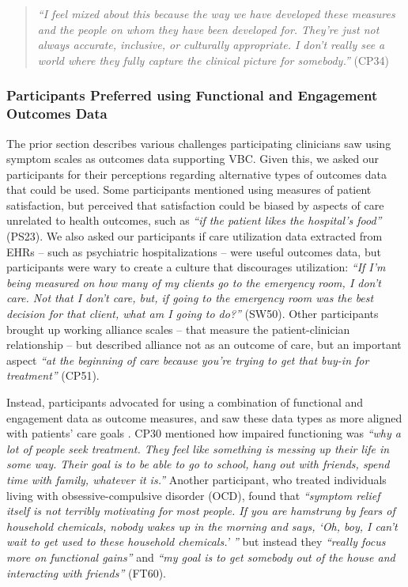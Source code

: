 \begin{quote}
    \textit{``I feel mixed about this because the way we have developed these measures and the people on whom they have been developed for. They're just not always accurate, inclusive, or culturally appropriate. 
    I don't really see a world where they fully capture the clinical picture for somebody.''} (CP34)
\end{quote}


\subsubsection{Participants Preferred using Functional and Engagement Outcomes Data}
\label{sec:findings:preparation:func-engagement}

The prior section describes various challenges participating clinicians saw using symptom scales as outcomes data supporting VBC.
Given this, we asked our participants for their perceptions regarding alternative types of outcomes data that could be used.
Some participants mentioned using measures of patient satisfaction, but perceived that satisfaction could be biased by aspects of care unrelated to health outcomes, such as \textit{``if the patient likes the hospital's food''} (PS23).
We also asked our participants if care utilization data extracted from EHRs -- such as psychiatric hospitalizations -- were useful outcomes data, but participants were wary to create a culture that discourages utilization: \textit{``If I'm being measured on how many of my clients go to the emergency room, I don't care. Not that I don't care, but, if going to the emergency room was the best decision for that client, what am I going to do?''} (SW50).
Other participants brought up working alliance scales -- that measure the patient-clinician relationship -- but described alliance not as an outcome of care, but an important aspect \textit{``at the beginning of care because you're trying to get that buy-in for treatment''} (CP51).

Instead, participants advocated for using a combination of functional and engagement data as outcome measures, and saw these data types as more aligned with patients' care goals . 
CP30 mentioned how impaired functioning was \textit{``why a lot of people seek treatment. They feel like something is messing up their life in some way. Their goal is to be able to go to school, hang out with friends, spend time with family, whatever it is.''}
Another participant, who treated individuals living with obsessive-compulsive disorder (OCD), found that \textit{``symptom relief itself is not terribly motivating for most people. If you are hamstrung by fears of household chemicals, nobody wakes up in the morning and says, `Oh, boy, I can't wait to get used to these household chemicals.' ''} but instead they \textit{``really focus more on functional gains''} and \textit{``my goal is to get somebody out of the house and interacting with friends''} (FT60).

